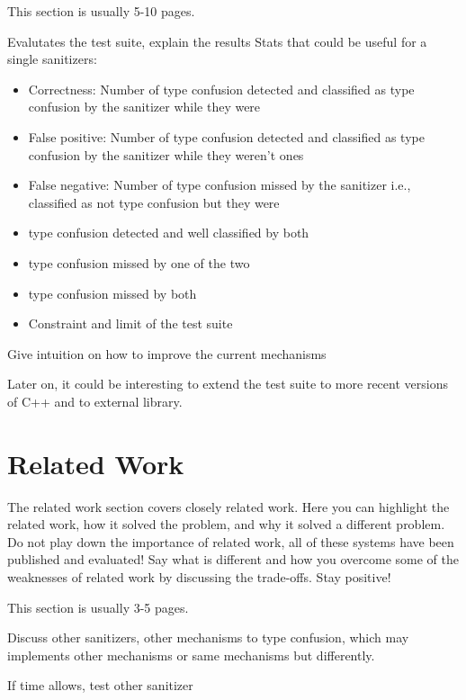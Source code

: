 \documentclass[a4paper,11pt,oneside]{report}
\begin{document}
This section is usually 5-10 pages.

Evalutates the test suite, explain the results
Stats that could be useful for a single sanitizers:
\begin{itemize}
       \item Correctness: Number of type confusion detected and classified as type confusion by the sanitizer while they were
       \item False positive: Number of type confusion detected and classified as type confusion by the sanitizer while they weren't ones
       \item False negative: Number of type confusion missed by the sanitizer i.e., classified as not type confusion but they were

       \item type confusion detected and well classified by both
       \item type confusion missed by one of the two
       \item type confusion missed by both

       \item Constraint and limit of the test suite

\end{itemize}

Give intuition on how to improve the current mechanisms



Later on,
it could be interesting to extend the test suite to more recent versions of C++
and to external library. 

\chapter{Related Work}

The related work section covers closely related work. Here you can highlight
the related work, how it solved the problem, and why it solved a different
problem. Do not play down the importance of related work, all of these
systems have been published and evaluated! Say what is different and how
you overcome some of the weaknesses of related work by discussing the 
trade-offs. Stay positive!

This section is usually 3-5 pages.

Discuss other sanitizers, other mechanisms to type confusion,
which may implements other mechanisms or same mechanisms but differently.

If time allows, test other sanitizer
\end{document}
